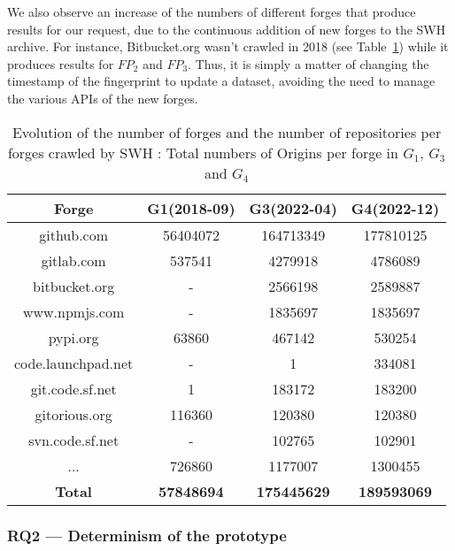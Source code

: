 We also observe an increase of the numbers of different forges that produce results for our request, due to the continuous addition of new forges to the SWH archive. For instance, Bitbucket.org wasn't crawled in 2018 (see Table~\ref{table:G2}) while it produces results for $FP_2$ and $FP_3$. Thus, it is simply a matter of changing the timestamp of the fingerprint to update a dataset,  avoiding the need to manage the various APIs of the new forges.
\begin{table}[ht]
\small
\centering
\caption{Evolution of the number of forges and the number of repositories per forges  crawled by SWH : Total numbers of Origins per forge in $G_1$, $G_3$ and $G_4$}
\vspace{-5 pt}

\begin{tabular}{ |c|c|c|c| }
\hline
 \textbf{Forge} & \textbf{G1(2018-09)} & \textbf{G3(2022-04)} & \textbf{G4(2022-12)} \\
\hline
                github.com &  56404072 &  164713349 & 177810125 \\
        gitlab.com &    537541 &    4279918 &   4786089 \\
     bitbucket.org &           - &    2566198 &   2589887 \\
     www.npmjs.com &           - &    1835697 &   1835697 \\
          pypi.org &     63860 &     467142 &    530254 \\
code.launchpad.net &           - &          1 &    334081 \\
   git.code.sf.net &         1 &     183172 &    183200 \\
     gitorious.org &    116360 &     120380 &    120380 \\
   svn.code.sf.net &           - &     102765 &    102901 \\
               ... &    726860 &    1177007 &   1300455 \\

 \hline
\textbf{Total} & \textbf{57848694} & \textbf{175445629}& \textbf{189593069} \\
 \hline
\end{tabular}
\label{table:G2}
\end{table}
\vspace{-1 em}


 \subsubsection{\textbf{RQ2 — Determinism of the prototype}}

